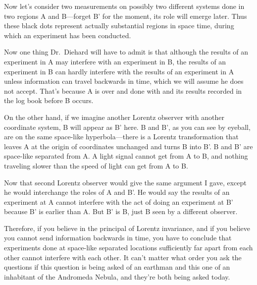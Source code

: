 \documentclass[twocolumn,prb]{revtex4}
\begin{document}
Now let's consider two measurements on possibly two different systems done in two regions A and B---forget B' for the moment, its role will emerge later. Thus these black dots represent actually substantial regions in space time, during which an experiment has been conducted.

Now one thing Dr.\ Diehard will have to admit is that although the results of an experiment in A may interfere with an experiment in B, the results of an experiment in B can hardly interfere with the results of an experiment in A unless information can travel backwards in time, which we will assume he does not accept. That's because A is over and done with and its results recorded in the log book before B occurs.

On the other hand, if we imagine another Lorentz observer with another coordinate system, B will appear as B' here. B and B', as you can see by eyeball, are on the same space-like hyperbola---there is a Lorentz transformation that leaves A at the origin of coordinates unchanged and turns B into B'. B and B' are space-like separated from A. A light signal cannot get from A to B, and nothing traveling slower than the speed of light can get from A to B.

Now that second Lorentz observer would give the same argument I gave, except he would interchange the roles of A and B'. He would say the results of an experiment at A cannot interfere with the act of doing an experiment at B' because B' is earlier than A. But B' is B, just B seen by a different observer.

Therefore, if you believe in the principal of Lorentz invariance, and if you believe you cannot send information backwards in time, you have to conclude that experiments done at space-like separated locations sufficiently far apart from each other cannot interfere with each other. It can't matter what order you ask the questions if this question is being asked of an earthman and this one of an inhabitant of the Andromeda Nebula, and they're both being asked today.
\end{document}
